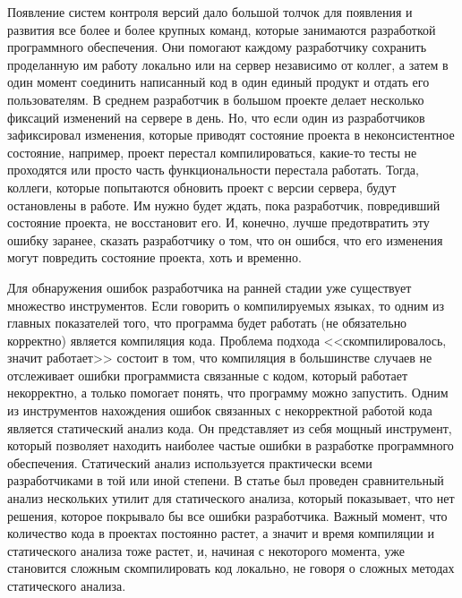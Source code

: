 Появление систем контроля версий дало большой толчок для появления и развития все более и более крупных команд, которые занимаются разработкой программного обеспечения. Они помогают каждому разработчику сохранить проделанную им работу локально или на сервер независимо от коллег, а затем в один момент соединить написанный код в один единый продукт и отдать его пользователям. В среднем разработчик в большом проекте делает несколько фиксаций изменений на сервере в день. Но, что если один из разработчиков зафиксировал изменения, которые приводят состояние проекта в неконсистентное состояние, например, проект перестал компилироваться, какие-то тесты не проходятся или просто часть функциональности перестала работать. Тогда, коллеги, которые попытаются обновить проект с версии сервера, будут остановлены в работе. Им нужно будет ждать, пока разработчик, повредивший состояние проекта, не восстановит его. И, конечно, лучше предотвратить эту ошибку заранее, сказать разработчику о том, что он ошибся, что его изменения могут повредить состояние проекта, хоть и временно. 

Для обнаружения ошибок разработчика на ранней стадии уже существует множество инструментов. Если говорить о компилируемых языках, то одним из главных показателей того, что программа будет работать (не обязательно корректно) является компиляция кода. Проблема подхода <<скомпилировалось, значит работает>> состоит в том, что компиляция в большинстве случаев не отслеживает ошибки программиста связанные с кодом, который работает некорректно, а только помогает понять, что программу можно запустить. Одним из инструментов нахождения ошибок связанных с некорректной работой кода является статический анализ кода. Он представляет из себя мощный инструмент, который позволяет находить наиболее частые ошибки в разработке программного обеспечения. Статический анализ используется практически всеми разработчиками в той или иной степени. В статье \cite{static-analysis} был проведен сравнительный анализ нескольких утилит для статического анализа, который показывает, что нет решения, которое покрывало бы все ошибки разработчика. Важный момент, что количество кода в проектах постоянно растет, а значит и время компиляции и статического анализа тоже растет, и, начиная с некоторого момента, уже становится сложным скомпилировать код локально, не говоря о сложных методах статического анализа.

